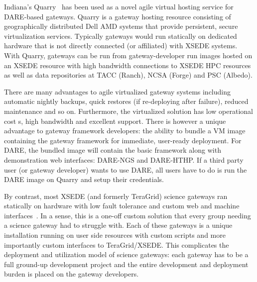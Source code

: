 \documentclass[]{svjour3}
\begin{document}
% 

Indiana's Quarry~\cite{quarry} has been used as a novel agile virtual hosting
service for DARE-based gateways. Quarry is a gateway hosting resource
consisting of
geographically distributed Dell AMD systems that provide persistent,
secure virtualization services. Typically gateways would run
statically on dedicated hardware that is not directly connected (or
affiliated) with XSEDE systems. With Quarry, gateways can be run from
gateway-developer run images hosted on an XSEDE resource with high
bandwidth connections to XSEDE HPC resources as well as data
repositories at TACC (Ranch), NCSA (Forge) and PSC (Albedo).

There are many advantages to agile virtualized gateway systems
including automatic nightly backups, quick restores (if re-deploying
after failure), reduced maintenance and so on. Furthermore, the
virtualized solution has low operational cost	s, high bandwidth and
excellent support. There is however a unique advantage to gateway
framework developers: the ability to bundle a VM image containing the
gateway framework for immediate, user-ready deployment. For DARE, the
bundled image will contain the basic framework along with
demonstration web interfaces: DARE-NGS and DARE-HTHP. If a third party
user (or gateway developer) wants to use DARE, all users have to do is
run the DARE image on Quarry and setup their credentials.

By contrast, most XSEDE (and formerly TeraGrid) science gateways ran
statically on hardware with low fault tolerance and custom web and
machine interfaces~\cite{xsedegateways}. In a
sense, this is a one-off custom solution that every group needing a
science gateway had to struggle with. Each of these gateways is a
unique installation running on user side resources with custom scripts
and more importantly custom interfaces to TeraGrid/XSEDE. This
complicates the deployment and utilization model of science gateways:
each gateway has to be a full ground-up development project and the
entire development and deployment burden is placed on the gateway
developers.
\end{document}
